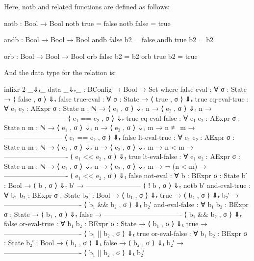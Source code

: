 \documentclass{lecturenotes}
\begin{document}
Here, \textsf{notb} and related functions are defined as follows:
\begin{code}
notb : Bool → Bool
notb true = false
notb false = true

andb : Bool → Bool → Bool
andb false b2 = false
andb true b2 = b2

orb : Bool → Bool → Bool
orb false b2 = b2
orb true b2 = true  
\end{code}

And the data type for the relation is:
\begin{code}
infixr 2 _⇓ₜ_
data _⇓ₜ_ : BConfig → Bool → Set where
     false-eval : ∀ {σ : State} → ⟨ false , σ ⟩ ⇓ₜ false
     true-eval : ∀ {σ : State} → ⟨ true , σ ⟩ ⇓ₜ true
     eq-eval-true : ∀ {e₁ e₂ : AExpr} {σ : State} {n : ℕ} →
              ⟨ e₁ , σ ⟩ ⇓ₐ n →
              ⟨ e₂ , σ ⟩ ⇓ₐ n →
       ---------------------------
        ⟨ e₁ == e₂ , σ ⟩ ⇓ₜ true
     eq-eval-false : ∀ {e₁ e₂ : AExpr} {σ : State} {n m : ℕ} →
             ⟨ e₁ , σ ⟩ ⇓ₐ n →
             ⟨ e₂ , σ ⟩ ⇓ₐ m →
                  n ≢ m →
       --------------------------
       ⟨ e₁ == e₂ , σ ⟩ ⇓ₜ false
     lt-eval-true : ∀ {e₁ e₂ : AExpr} {σ : State} {n m : ℕ} →
              ⟨ e₁ , σ ⟩ ⇓ₐ n →
              ⟨ e₂ , σ ⟩ ⇓ₐ m →
                       n < m →
       ----------------------------
        ⟨ e₁ << e₂ , σ ⟩ ⇓ₜ true
     lt-eval-false : ∀ {e₁ e₂ : AExpr} {σ : State} {n m : ℕ} →
              ⟨ e₁ , σ ⟩ ⇓ₐ n →
              ⟨ e₂ , σ ⟩ ⇓ₐ m →
                       ¬ (n < m) →
       ----------------------------
        ⟨ e₁ << e₂ , σ ⟩ ⇓ₜ false
     not-eval : ∀ {b : BExpr} {σ : State} {b′ : Bool} → 
          ⟨ b , σ ⟩ ⇓ₜ b′ →
       ------------------------
        ⟨ ! b , σ ⟩ ⇓ₜ notb b′
     and-eval-true : ∀ {b₁ b₂ : BExpr} {σ : State} {b₂′ : Bool} →
              ⟨ b₁ , σ ⟩ ⇓ₜ true →
              ⟨ b₂ , σ ⟩ ⇓ₜ b₂′ →
       ----------------------------------
        ⟨ b₁ && b₂ , σ ⟩ ⇓ₜ b₂′
     and-eval-false : ∀ {b₁ b₂ : BExpr} {σ : State} → 
              ⟨ b₁ , σ ⟩ ⇓ₜ false →
       ----------------------------------
        ⟨ b₁ && b₂ , σ ⟩ ⇓ₜ false
     or-eval-true : ∀ {b₁ b₂ : BExpr} {σ : State} →
              ⟨ b₁ , σ ⟩ ⇓ₜ true →
       ----------------------------------
        ⟨ b₁ || b₂ , σ ⟩ ⇓ₜ true
     or-eval-false : ∀ {b₁ b₂ : BExpr} {σ : State} {b₂′ : Bool} → 
              ⟨ b₁ , σ ⟩ ⇓ₜ false →
              ⟨ b₂ , σ ⟩ ⇓ₜ b₂′ → 
       ----------------------------------
        ⟨ b₁ || b₂ , σ ⟩ ⇓ₜ b₂′ 
\end{code}
\end{document}
